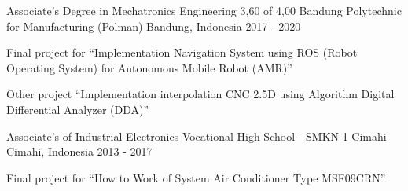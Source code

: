 

\begin{cventries}

  \cventry
    {Associate's Degree in Mechatronics Engineering 3,60 of 4,00} %
    {Bandung Polytechnic for Manufacturing (Polman)} %
    {Bandung, Indonesia} %
    {2017 - 2020} %
    {
      \begin{cvitems} %
        \item {Final project for “Implementation Navigation System using ROS (Robot Operating System) for Autonomous Mobile Robot (AMR)”}
        \item {Other project “Implementation interpolation CNC 2.5D using Algorithm Digital Differential Analyzer (DDA)”}
      \end{cvitems}
    }
    
  \cventry
    {Associate's of Industrial Electronics} %
    {Vocational High School - SMKN 1 Cimahi} %
    {Cimahi, Indonesia} %
    {2013 - 2017} %
    {
      \begin{cvitems} %
        \item {Final project for “How to Work of System Air Conditioner Type MSF09CRN”}
      \end{cvitems}
    }

\end{cventries}
